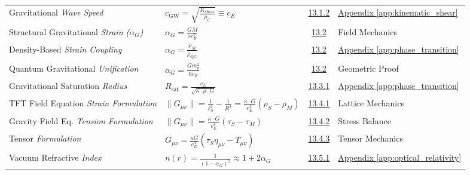 \begin{longtable}{@{} p{4.5cm} p{6cm} c p{4cm} @{}}
Gravitational \newline \textit{Wave Speed} & $c_{\text{GW}} = \sqrt{\frac{K_{\text{shear}}}{\rho_C}} \equiv c_E$ & \hyperref[sec:13.1.2]{13.1.2} & \hyperref[app:kinematic_shear]{Appendix \ref*{app:kinematic_shear}} \\

Structural Gravitational \newline \textit{Strain ($\alpha_G$)} & $\alpha_G = \frac{G M}{r c_E^2}$ & \hyperref[sec:13.2]{13.2} & Field Mechanics \\

Density-Based \newline \textit{Strain Coupling} & $\alpha_G = \frac{\rho_M}{\rho_{\text{QG}}}$ & \hyperref[sec:13.2]{13.2} & \hyperref[app:phase_transition]{Appendix \ref*{app:phase_transition}} \\

Quantum Gravitational \newline \textit{Unification} & $\alpha_G = \frac{G m_p^2}{\hbar c_E}$ & \hyperref[sec:13.2]{13.2} & Geometric Proof \\

Gravitational Saturation \newline \textit{Radius} & $R_{\text{sat}} = \frac{c_E}{\sqrt{\kappa \cdot \rho \cdot G}}$ & \hyperref[sec:13.3.1]{13.3.1} & \hyperref[app:phase_transition]{Appendix \ref*{app:phase_transition}} \\

TFT Field Equation \newline \textit{Strain Formulation} & $\|G_{\mu\nu}\| = \frac{1}{\ell_S^2} - \frac{1}{R^2} = \frac{\kappa \cdot G}{c_E^2}(\rho_S - \rho_M)$ & \hyperref[sec:13.4.1]{13.4.1} & Lattice Mechanics \\

Gravity Field Eq. \newline \textit{Tension Formulation} & $\|G_{\mu\nu}\| = \frac{\kappa \cdot G}{c_E^4}(\tau_S - \tau_M)$ & \hyperref[sec:13.4.2]{13.4.2} & Stress Balance \\

Tensor \newline \textit{Formulation} & $G_{\mu\nu} = \frac{\kappa G}{c_E^4}(\tau_S \eta_{\mu\nu} - T_{\mu\nu})$ & \hyperref[sec:13.4.3]{13.4.3} & Tensor Mechanics \\

Vacuum Refractive \newline \textit{Index} & $n(r) = \frac{1}{(1 - \alpha_G)^2} \approx 1 + 2\alpha_G$ & \hyperref[sec:13.5.1]{13.5.1} & \hyperref[app:optical_relativity]{Appendix \ref*{app:optical_relativity}} \\


\end{longtable}

